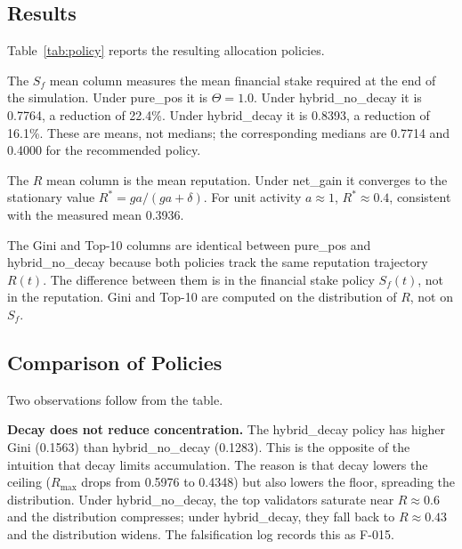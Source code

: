 \documentclass[11pt,a4paper]{article}
\numberwithin{equation}{section}
\numberwithin{table}{section}
\begin{document}
\subsection{Results}
Table~\ref{tab:policy} reports the resulting allocation policies.
\begin{table}[H]
\centering
\caption{Allocation policy under each bootstrap model: Gini, top-ten concentration and reputation statistics.}
\label{tab:policy}
\end{table}

The $S_f$ mean column measures the mean financial stake required at the end of the simulation. Under pure\_pos it is $\Theta = 1.0$. Under hybrid\_no\_decay it is 0.7764, a reduction of 22.4\%. Under hybrid\_decay it is 0.8393, a reduction of 16.1\%. These are means, not medians; the corresponding medians are 0.7714 and 0.4000 for the recommended policy.

The $R$ mean column is the mean reputation. Under net\_gain it converges to the stationary value $R^* = g a / (g a + \delta)$. For unit activity $a \approx 1$, $R^* \approx 0.4$, consistent with the measured mean 0.3936.

The Gini and Top-10 columns are identical between pure\_pos and hybrid\_no\_decay because both policies track the same reputation trajectory $R(t)$. The difference between them is in the financial stake policy $S_f(t)$, not in the reputation. Gini and Top-10 are computed on the distribution of $R$, not on $S_f$.

\subsection{Comparison of Policies}
Two observations follow from the table.

\textbf{Decay does not reduce concentration.} The hybrid\_decay policy has higher Gini (0.1563) than hybrid\_no\_decay (0.1283). This is the opposite of the intuition that decay limits accumulation. The reason is that decay lowers the ceiling ($R_{\max}$ drops from 0.5976 to 0.4348) but also lowers the floor, spreading the distribution. Under hybrid\_no\_decay, the top validators saturate near $R \approx 0.6$ and the distribution compresses; under hybrid\_decay, they fall back to $R \approx 0.43$ and the distribution widens. The falsification log records this as F-015.
\end{document}
